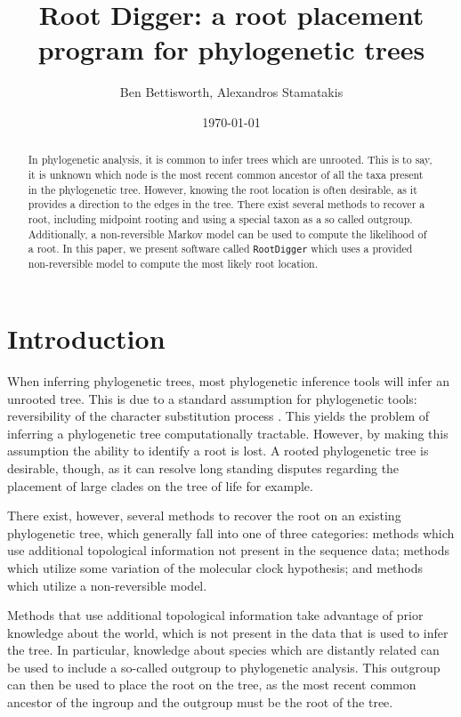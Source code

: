 \documentclass{article}
\title{Root Digger: a root placement program for phylogenetic trees}
\author{Ben Bettisworth, Alexandros Stamatakis}
\date{\today}
\newcommand{\RootDiggertt}{\texttt{RootDigger}}
\begin{document}
\begin{abstract}
  In phylogenetic analysis, it is common to infer trees which are unrooted.
  This is to say, it is unknown which node is the most recent common ancestor of
  all the taxa present in the phylogenetic tree.  However, knowing the root
  location is often desirable, as it provides a direction to the edges in the
  tree.  There exist several methods to recover a root, including midpoint
  rooting and using a special taxon as a so called outgroup.  Additionally, a
  non-reversible Markov model can be used to compute the likelihood of a root.
  In this paper, we present software called \RootDiggertt{} which uses a
  provided non-reversible model to compute the most likely root location.
\end{abstract}

\maketitle

\section{Introduction}

When inferring phylogenetic trees, most phylogenetic inference tools
\cite{nguyen_iq-tree:_2015, stamatakis_raxml_2014, minh_iq-tree_2019} will infer
an unrooted tree. This is due to a standard assumption for phylogenetic tools:
reversibility of the character substitution process
\cite{felsenstein_evolutionary_1981}.  This yields the problem of inferring a
phylogenetic tree computationally tractable.  However, by making this assumption
the ability to identify a root is lost. A rooted phylogenetic tree is desirable,
though, as it can resolve long standing disputes regarding the placement of
large clades on the tree of life \cite{dunn_animal_2014} for example.

There exist, however, several methods to recover the root on an existing
phylogenetic tree, which generally fall into one of three categories: methods
which use additional topological information not present in the sequence data;
methods which utilize some variation of the molecular clock hypothesis; and
methods which utilize a non-reversible model.

Methods that use additional topological information take advantage of prior
knowledge about the world, which is not present in the data that is used to
infer the tree. In particular, knowledge about species which are distantly
related can be used to include a so-called outgroup to phylogenetic analysis.
This outgroup can then be used to place the root on the tree, as the most recent
common ancestor of the ingroup and the outgroup must be the root of the tree.
\end{document}
